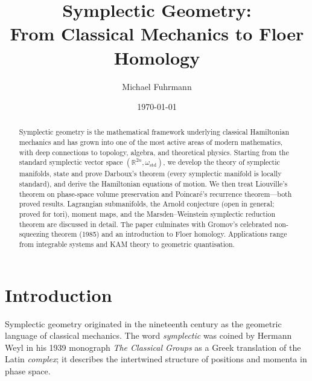 \documentclass[12pt,a4paper]{amsart}
\theoremstyle{definition}
\begin{document}
\title{Symplectic Geometry:\\
From Classical Mechanics to Floer Homology}

\author{Michael Fuhrmann}
\address{Specialist Mathematics Project, Build 139}
\date{\today}

\begin{abstract}
Symplectic geometry is the mathematical framework underlying classical
Hamiltonian mechanics and has grown into one of the most active areas of
modern mathematics, with deep connections to topology, algebra, and
theoretical physics.  Starting from the standard symplectic vector space
$(\mathbb{R}^{2n}, \omega_{\mathrm{std}})$, we develop the theory of
symplectic manifolds, state and prove Darboux's theorem (every symplectic
manifold is locally standard), and derive the Hamiltonian equations of
motion.  We then treat Liouville's theorem on phase-space volume preservation
and Poincar\'{e}'s recurrence theorem---both proved results.  Lagrangian
submanifolds, the Arnold conjecture (open in general; proved for tori),
moment maps, and the Marsden--Weinstein symplectic reduction theorem are
discussed in detail.  The paper culminates with Gromov's celebrated
non-squeezing theorem (1985) and an introduction to Floer homology.
Applications range from integrable systems and KAM theory to geometric
quantisation.
\end{abstract}

\maketitle

\tableofcontents

\section{Introduction}

Symplectic geometry originated in the nineteenth century as the geometric
language of classical mechanics.  The word \emph{symplectic} was coined by
Hermann Weyl in his 1939 monograph \emph{The Classical Groups} as a Greek
translation of the Latin \emph{complex}; it describes the intertwined
structure of positions and momenta in phase space.
\end{document}
